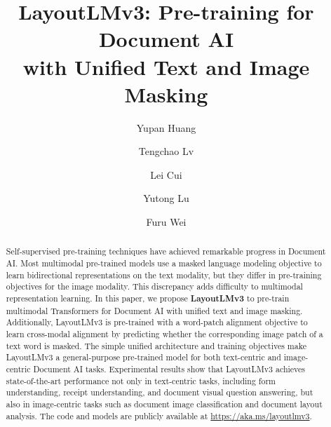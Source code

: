 \documentclass[sigconf]{acmart}
\begin{document}
\fancyhead{}


\title[LayoutLMv3: Pre-training for Document AI with Unified Text and Image Masking]{LayoutLMv3: Pre-training for Document AI \\ with Unified Text and Image Masking}



\author{Yupan Huang}

\author{Tengchao Lv}

\author{Lei Cui}

\author{Yutong Lu}

\author{Furu Wei}
\renewcommand{\shortauthors}{Huang, et al.}

\begin{abstract}
Self-supervised pre-training techniques have achieved remarkable progress in Document AI. Most multimodal pre-trained models use a masked language modeling objective to learn bidirectional representations on the text modality, but they differ in pre-training objectives for the image modality. This discrepancy adds difficulty to multimodal representation learning. In this paper, we propose \textbf{LayoutLMv3} to pre-train multimodal Transformers for Document AI with unified text and image masking. Additionally, LayoutLMv3 is pre-trained with a word-patch alignment objective to learn cross-modal alignment by predicting whether the corresponding image patch of a text word is masked. The simple unified architecture and training objectives make LayoutLMv3 a general-purpose pre-trained model for both text-centric and image-centric Document AI tasks. Experimental results show that LayoutLMv3 achieves state-of-the-art performance not only in text-centric tasks, including form understanding, receipt understanding, and document visual question answering, but also in image-centric tasks such as document image classification and document layout analysis. The code and models are publicly available at \url{https://aka.ms/layoutlmv3}.
\end{abstract}
\end{document}

